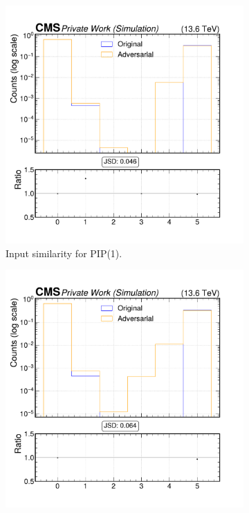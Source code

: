 \begin{figure}[h]
  \centering
  \begin{subfigure}[t]{0.32\textwidth}
    \includegraphics[width=\linewidth]{media/output/features/compare/intprob_1/cmp_cpf_arr_Cpfcan_quality.pdf}
    \caption{Input similarity for PIP(1).}
  \end{subfigure}\hfill
  \begin{subfigure}[t]{0.32\textwidth}
    \includegraphics[width=\linewidth]{media/output/features/compare/intprob_2/cmp_cpf_arr_Cpfcan_quality.pdf}

\end{subfigure}
\end{figure}

